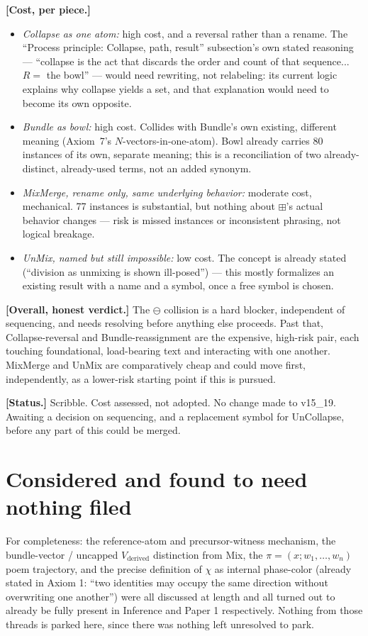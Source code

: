 \documentclass[11pt]{article}
\begin{document}
\textbf{[Cost, per piece.]}
\begin{itemize}
\item \emph{Collapse as one atom:} high cost, and a reversal rather
      than a rename. The ``Process principle: Collapse, path,
      result'' subsection's own stated reasoning --- ``collapse is
      the act that discards the order and count of that sequence...
      $R=$ the bowl'' --- would need rewriting, not relabeling: its
      current logic explains why collapse yields a set, and that
      explanation would need to become its own opposite.
\item \emph{Bundle as bowl:} high cost. Collides with Bundle's own
      existing, different meaning (Axiom~7's $N$-vectors-in-one-atom).
      Bowl already carries 80 instances of its own, separate meaning;
      this is a reconciliation of two already-distinct, already-used
      terms, not an added synonym.
\item \emph{MixMerge, rename only, same underlying behavior:}
      moderate cost, mechanical. 77 instances is substantial, but
      nothing about $\boxplus$'s actual behavior changes --- risk is
      missed instances or inconsistent phrasing, not logical
      breakage.
\item \emph{UnMix, named but still impossible:} low cost. The concept
      is already stated (``division as unmixing is shown ill-posed'')
      --- this mostly formalizes an existing result with a name and a
      symbol, once a free symbol is chosen.
\end{itemize}

\textbf{[Overall, honest verdict.]} The $\ominus$ collision is a hard
blocker, independent of sequencing, and needs resolving before
anything else proceeds. Past that, Collapse-reversal and
Bundle-reassignment are the expensive, high-risk pair, each touching
foundational, load-bearing text and interacting with one another.
MixMerge and UnMix are comparatively cheap and could move first,
independently, as a lower-risk starting point if this is pursued.

\textbf{[Status.]} Scribble. Cost assessed, not adopted. No change
made to v15\_19. Awaiting a decision on sequencing, and a replacement
symbol for UnCollapse, before any part of this could be merged.

\section{Considered and found to need nothing filed}



For completeness: the reference-atom and precursor-witness mechanism,
the bundle-vector / uncapped $V_{\text{derived}}$ distinction from
Mix, the $\pi=(x;w_1,\ldots,w_n)$ poem trajectory, and the precise
definition of $\chi$ as internal phase-color (already stated in
Axiom 1: ``two identities may occupy the same direction without
overwriting one another'') were all discussed at length and all
turned out to already be fully present in Inference and Paper 1
respectively. Nothing from those threads is parked here, since there
was nothing left unresolved to park.
\end{document}
